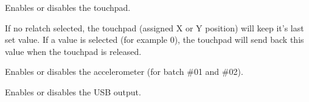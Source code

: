   

Enables or disables the touchpad.

   \settingopt{\ldots} 

If no relatch selected, the touchpad (assigned X or Y position) will keep it's last set value. If a value is selected (for example 0), the touchpad will send back this value when the touchpad is released.

  

Enables or disables the accelerometer (for batch \#01 and \#02).

  

Enables or disables the USB output.

